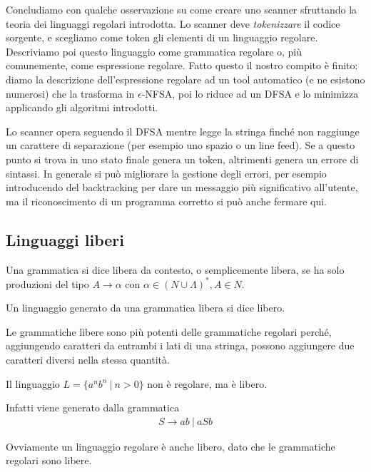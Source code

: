 \documentclass[12pt]{article}
\numberwithin{theorem}{subsection}
\begin{document}
Concludiamo con qualche osservazione su come creare uno scanner sfruttando la teoria dei linguaggi regolari introdotta. Lo scanner deve \textit{tokenizzare} il codice sorgente, e scegliamo come token gli elementi di un linguaggio regolare. Descriviamo poi questo linguaggio come grammatica regolare o, più comunemente, come espressione regolare. Fatto questo il nostro compito è finito: diamo la descrizione dell'espressione regolare ad un tool automatico (e ne esistono numerosi) che la trasforma in $\epsilon$-NFSA, poi lo riduce ad un DFSA e lo minimizza applicando gli algoritmi introdotti.

Lo scanner opera seguendo il DFSA mentre legge la stringa finché non raggiunge un carattere di separazione (per esempio uno spazio o un line feed). Se a questo punto si trova in uno stato finale genera un token, altrimenti genera un errore di sintassi. In generale si può migliorare la gestione degli errori, per esempio introducendo del backtracking per dare un messaggio più significativo all'utente, ma il riconoscimento di un programma corretto si può anche fermare qui.

\newpage
\subsection{Linguaggi liberi}
\begin{definition}
	Una grammatica si dice libera da contesto, o semplicemente libera, se ha solo produzioni del tipo  $A \rightarrow \alpha$ con $\alpha \in (N \cup \Lambda)^*, A \in N$.
	
	Un linguaggio generato da una grammatica libera si dice libero.
\end{definition}
Le grammatiche libere sono più potenti delle grammatiche regolari perché, aggiungendo caratteri da entrambi i lati di una stringa, possono aggiungere due caratteri diversi nella stessa quantità.

\begin{example}
	Il linguaggio $L=\{ a^n b^n \ \vert \ n > 0 \}$ non è regolare, ma è libero.
	
	Infatti viene generato dalla grammatica
	\begin{align*}
		S \rightarrow ab \ \vert \ aSb
	\end{align*}
\end{example}

\begin{remark}
	Ovviamente un linguaggio regolare è anche libero, dato che le grammatiche regolari sono libere.
\end{remark}
\end{document}
